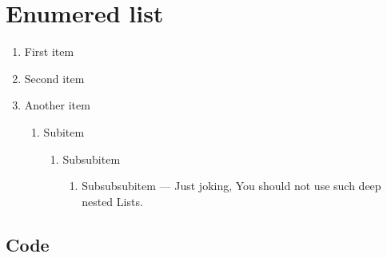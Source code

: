 \section{Enumered list}
\begin{enumerate}
    \item First item
    \item Second item
    \item Another item
    \begin{enumerate}
        \item Subitem
        \begin{enumerate}
            \item Subsubitem
            \begin{enumerate}
                \item Subsubsubitem --- Just joking, You should not use such 
                    deep nested Lists.

            \end{enumerate}
        \end{enumerate}
    \end{enumerate}
\end{enumerate}

\subsection{Code}

